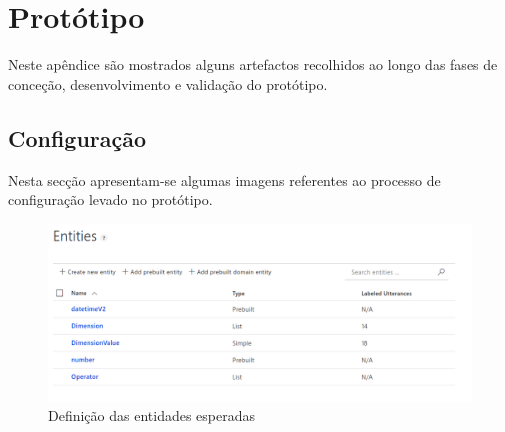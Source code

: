 \chapter{Protótipo}
\label{AppendixC}
Neste apêndice são mostrados alguns artefactos recolhidos ao longo das fases de conceção, desenvolvimento e validação do protótipo.

\section{Configuração}
Nesta secção apresentam-se algumas imagens referentes ao processo de configuração levado no protótipo.
%
\begin{figure}[!ht]
    \centering
    \includegraphics[width=\textwidth]{appendices/assets/kb07.png}
    \caption{Definição das entidades esperadas}
\end{figure}
%
